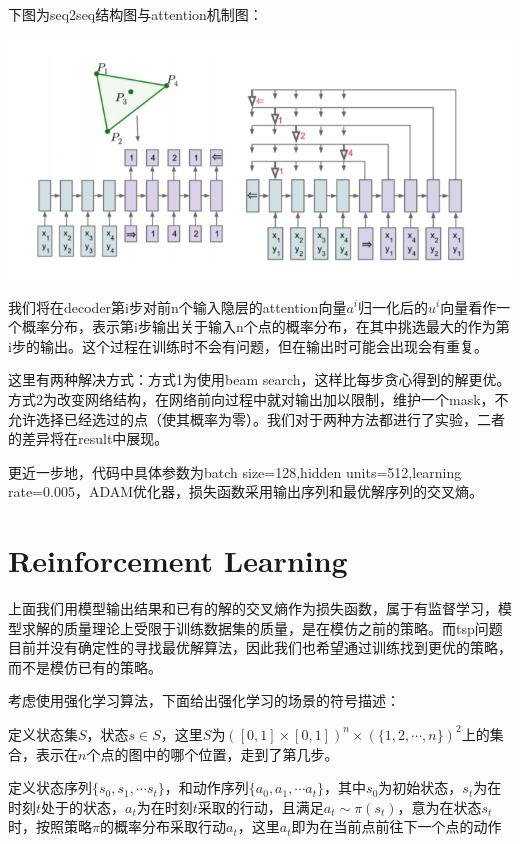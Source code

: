 \documentclass[a4paper]{article}
\begin{document}
下图为seq2seq结构图与attention机制图：

\includegraphics[]{../fig/pic1.png}

我们将在decoder第i步对前n个输入隐层的attention向量$a^i$归一化后的$u^i$向量看作一个概率分布，表示第i步输出关于输入n个点的概率分布，在其中挑选最大的作为第i步的输出。这个过程在训练时不会有问题，但在输出时可能会出现会有重复。

这里有两种解决方式：方式1为使用beam search，这样比每步贪心得到的解更优。方式2为改变网络结构，在网络前向过程中就对输出加以限制，维护一个mask，不允许选择已经选过的点（使其概率为零）。我们对于两种方法都进行了实验，二者的差异将在result中展现。

更近一步地，代码中具体参数为batch size=128,hidden units=512,learning rate=0.005，ADAM优化器，损失函数采用输出序列和最优解序列的交叉熵。



\section*{Reinforcement Learning}

上面我们用模型输出结果和已有的解的交叉熵作为损失函数，属于有监督学习，模型求解的质量理论上受限于训练数据集的质量，是在模仿之前的策略。而tsp问题目前并没有确定性的寻找最优解算法，因此我们也希望通过训练找到更优的策略，而不是模仿已有的策略。

考虑使用强化学习算法，下面给出强化学习的场景的符号描述：

定义状态集$S$，状态$s\in S$，这里$S$为$\left([0,1]\times[0,1]\right)^n\times\left(\{1,2,\dotsb,n\}\right)^2$上的集合，表示在$n$个点的图中的哪个位置，走到了第几步。

定义状态序列$\{s_0,s_1,\dotsb s_t\}$，和动作序列$\{a_0,a_1,\dotsb a_t\}$，其中$s_0$为初始状态，$s_t$为在时刻$t$处于的状态，$a_t$为在时刻$t$采取的行动，且满足$a_t\sim \pi\left(s_{t}\right)$，意为在状态$s_t$时，按照策略$\pi$的概率分布采取行动$a_t$，这里$a_t$即为在当前点前往下一个点的动作
\end{document}
